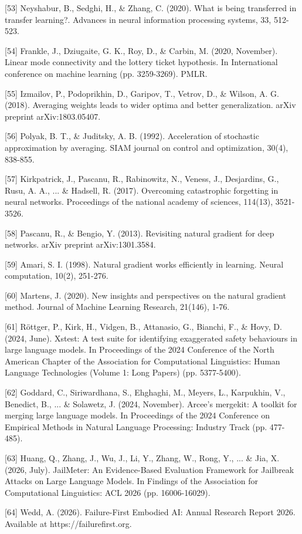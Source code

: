 \documentclass{article}
\begin{document}
{[53] Neyshabur, B., Sedghi, H., \& Zhang, C. (2020). What is being transferred in transfer learning?. Advances in neural information processing systems, 33, 512-523.

[54] Frankle, J., Dziugaite, G. K., Roy, D., \& Carbin, M. (2020, November). Linear mode connectivity and the lottery ticket hypothesis. In International conference on machine learning (pp. 3259-3269). PMLR.

[55] Izmailov, P., Podoprikhin, D., Garipov, T., Vetrov, D., \& Wilson, A. G. (2018). Averaging weights leads to wider optima and better generalization. arXiv preprint arXiv:1803.05407.

[56] Polyak, B. T., \& Juditsky, A. B. (1992). Acceleration of stochastic approximation by averaging. SIAM journal on control and optimization, 30(4), 838-855.

[57] Kirkpatrick, J., Pascanu, R., Rabinowitz, N., Veness, J., Desjardins, G., Rusu, A. A., ... \& Hadsell, R. (2017). Overcoming catastrophic forgetting in neural networks. Proceedings of the national academy of sciences, 114(13), 3521-3526.

[58] Pascanu, R., \& Bengio, Y. (2013). Revisiting natural gradient for deep networks. arXiv preprint arXiv:1301.3584.

[59] Amari, S. I. (1998). Natural gradient works efficiently in learning. Neural computation, 10(2), 251-276.

[60] Martens, J. (2020). New insights and perspectives on the natural gradient method. Journal of Machine Learning Research, 21(146), 1-76.

[61] Röttger, P., Kirk, H., Vidgen, B., Attanasio, G., Bianchi, F., \& Hovy, D. (2024, June). Xstest: A test suite for identifying exaggerated safety behaviours in large language models. In Proceedings of the 2024 Conference of the North American Chapter of the Association for Computational Linguistics: Human Language Technologies (Volume 1: Long Papers) (pp. 5377-5400).

[62] Goddard, C., Siriwardhana, S., Ehghaghi, M., Meyers, L., Karpukhin, V., Benedict, B., ... \& Solawetz, J. (2024, November). Arcee’s mergekit: A toolkit for merging large language models. In Proceedings of the 2024 Conference on Empirical Methods in Natural Language Processing: Industry Track (pp. 477-485).

[63] Huang, Q., Zhang, J., Wu, J., Li, Y., Zhang, W., Rong, Y., ... \& Jia, X. (2026, July). JailMeter: An Evidence-Based Evaluation Framework for Jailbreak Attacks on Large Language Models. In Findings of the Association for Computational Linguistics: ACL 2026 (pp. 16006-16029).

[64] Wedd, A. (2026). Failure-First Embodied AI: Annual Research Report 2026. Available at https://failurefirst.org.
}
\end{document}
